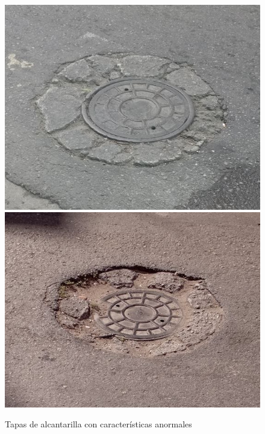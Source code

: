 \begin{appendices}
		\begin{figure}[htb]
			\centering
			\includegraphics[scale = 0.3]{Graphics/pothole_4.jpg}
			\includegraphics[scale = 0.3]{Graphics/pothole_5.jpg}
			\caption{Tapas de alcantarilla con características anormales}
			\label{fig:17}
		\end{figure}
		\newpage


\end{appendices}
